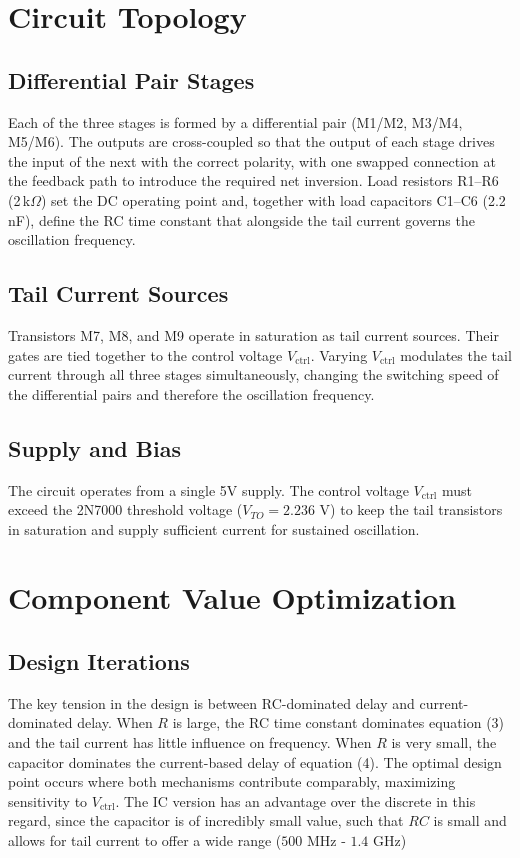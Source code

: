 \documentclass[11pt]{article}
\begin{document}
\section{Circuit Topology}
\subsection{Differential Pair Stages}

Each of the three stages is formed by a differential pair (M1/M2, M3/M4, M5/M6). The
outputs are cross-coupled so that the output of each stage drives the input of the next
with the correct polarity, with one swapped connection at the feedback path to introduce
the required net inversion. Load resistors R1--R6 (2\,k\(\Omega\)) set the DC operating
point and, together with load capacitors C1--C6 (2.2\,nF), define the RC time constant
that alongside the tail current governs the oscillation frequency.


\subsection{Tail Current Sources}

Transistors M7, M8, and M9 operate in saturation as tail current sources. Their gates are
tied together to the control voltage $V_{\text{ctrl}}$. Varying $V_{\text{ctrl}}$ modulates the
tail current through all three stages simultaneously, changing the switching speed of the
differential pairs and therefore the oscillation frequency.


\subsection{Supply and Bias}

The circuit operates from a single 5V supply. The control voltage $V_{\text{ctrl}}$ must
exceed the 2N7000 threshold voltage ($V_{TO} = 2.236\text{ V}$) to keep the tail
transistors in saturation and supply sufficient current for sustained oscillation.


\section{Component Value Optimization}
\subsection{Design Iterations}

The key tension in the design is between RC-dominated delay and current-dominated
delay. When $R$ is large, the RC time constant dominates equation (3) and the tail
current has little influence on frequency. When $R$ is very small, the capacitor dominates
the current-based delay of equation (4). The optimal design point occurs where both
mechanisms contribute comparably, maximizing sensitivity to $V_{\text{ctrl}}$. The IC version has an advantage over the discrete in this regard, since the capacitor is of incredibly small value, such that $RC$ is small and allows for tail current to offer a wide range ($500$ MHz - $1.4$ GHz)
\end{document}
